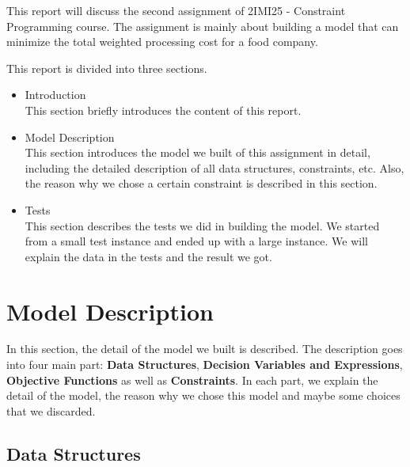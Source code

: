 \documentclass[a4paper, 12pt]{article}
\newcommand{\twoline}{\vspace{2ex}}
\begin{document}
This report will discuss the second assignment of 2IMI25 - Constraint Programming course. The assignment is mainly about building a model that can minimize the total weighted processing cost for a food company. 
\twoline 

This report is divided into three sections. 
\begin{itemize}
    \item Introduction \\
        This section briefly introduces the content of this report. 
    \item Model Description \\
        This section introduces the model we built of this assignment in detail, including the detailed description of all data structures, constraints, etc. Also, the reason why we chose a certain constraint is described in this section. 
    \item Tests \\
        This section describes the tests we did in building the model. We started from a small test instance and ended up with a large instance. We will explain the data in the tests and the result we got. 
\end{itemize}

\newpage

\section{Model Description}

In this section, the detail of the model we built is described. The description goes into four main part: \textbf{Data Structures}, \textbf{Decision Variables and Expressions}, \textbf{Objective Functions} as well as \textbf{Constraints}. In each part, we explain the detail of the model, the reason why we chose this model and maybe some choices that we discarded. 

\subsection{Data Structures}
\twoline
\end{document}
